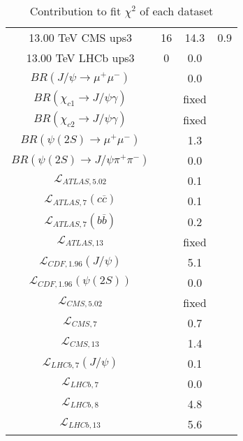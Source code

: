 \begin{table}[h!]
\begin{tabular}{c|c|c|c}
13.00 TeV CMS ups3 & 16 & 14.3 & 0.9 \\
13.00 TeV LHCb ups3 & 0 & 0.0 &  \\
\hline
$BR(J/\psi\rightarrow\mu^+\mu^-)$ &  & 0.0 &  \\
$BR(\chi_{c1}\rightarrow J/\psi\gamma)$ &  & fixed & \\
$BR(\chi_{c2}\rightarrow J/\psi\gamma)$ &  & fixed & \\
$BR(\psi(2S)\rightarrow\mu^+\mu^-)$ &  & 1.3 &  \\
$BR(\psi(2S)\rightarrow J/\psi\pi^+\pi^-)$ &  & 0.0 &  \\
$\mathcal L_{ATLAS,5.02}$ &  & 0.1 &  \\
$\mathcal L_{ATLAS,7}(c\overline c)$ &  & 0.1 &  \\
$\mathcal L_{ATLAS,7}(b\overline b)$ &  & 0.2 &  \\
$\mathcal L_{ATLAS,13}$ &  & fixed & \\
$\mathcal L_{CDF,1.96}(J/\psi)$ &  & 5.1 &  \\
$\mathcal L_{CDF,1.96}(\psi(2S))$ &  & 0.0 &  \\
$\mathcal L_{CMS,5.02}$ &  & fixed & \\
$\mathcal L_{CMS,7}$ &  & 0.7 &  \\
$\mathcal L_{CMS,13}$ &  & 1.4 &  \\
$\mathcal L_{LHCb,7}(J/\psi)$ &  & 0.1 &  \\
$\mathcal L_{LHCb,7}$ &  & 0.0 &  \\
$\mathcal L_{LHCb,8}$ &  & 4.8 &  \\
$\mathcal L_{LHCb,13}$ &  & 5.6 &  \\
\end{tabular}
\caption{Contribution to fit $\chi^2$ of each dataset}
\end{table}
